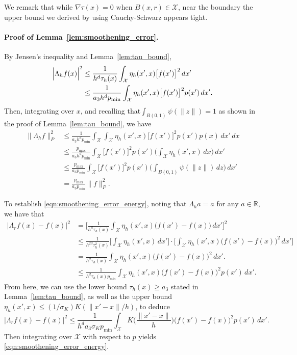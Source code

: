 \documentclass[twoside]{article}
\newcommand{\Reals}{\mathbb{R}}
\newcommand{\1}{\mathbf{1}}
\newcommand{\Xset}{\mathcal{X}}
\theoremstyle{definition}
\theoremstyle{remark}
\begin{document}
We remark that while $\nabla\tau(x) = 0$ when $B(x,r) \in \Xset$, near the boundary the upper bound we derived by using Cauchy-Schwarz appears tight. 

\paragraph{Proof of Lemma~\ref{lem:smoothening_error}.}
By Jensen's inequality and Lemma~\ref{lem:tau_bound},
\begin{align*}
\Bigl|\Lambda_hf(x)\Bigr|^2 & \leq \frac{1}{h^d\tau_h(x)}\int_{\Xset} \eta_h(x',x) \bigl[f(x')\bigr]^2 \,dx' \\
& \leq \frac{1}{a_3 h^dp_{\min}}\int_{\Xset} \eta_h(x',x) \bigl[f(x')\bigr]^2 p(x') \,dx'.
\end{align*}
Then, integrating over $x$, and recalling that$\int_{B(0,1)} \psi(\|z\|) = 1$ as shown in the proof of Lemma~\ref{lem:tau_bound}, we have
\begin{align*}
\bigl\|\Lambda_hf\bigr\|_{P}^2 & \leq \frac{1}{a_3h^d p_{\min}} \int_{\Xset} \int_{\Xset} \eta_h(x',x) \bigl[f(x')\bigr]^2 p(x') p(x) \,dx' \,dx \\ 
& \leq \frac{p_{\max}}{a_3h^dp_{\min}} \int_{\Xset} \bigl[f(x')\bigr]^2 p(x') \biggl(\int_{\Xset} \eta_h(x',x) \,dx\biggr) \,dx' \\
& \leq \frac{p_{\max}}{a_3p_{\min}} \int_{\Xset} \bigl[f(x')\bigr]^2 p(x') \biggl(\int_{B(0,1)} \psi(\|z\|) \,dz\biggr) \,dx' \\
& = \frac{p_{\max}}{a_3p_{\min}} \|f\|_{P}^2.
\end{align*}

To establish \eqref{eqn:smoothening_error_energy}, noting that $\Lambda_ha = a$ for any $a \in \Reals$, we have that
\begin{align*}
\bigl|\Lambda_rf(x) - f(x)\bigr|^2 & = \biggl[\frac{1}{h^d\tau_h(x)} \int_{\Xset} \eta_h(x',x) \bigl(f(x') - f(x)\bigr) \,dx'\biggr]^2 \\
& \leq \frac{1}{h^{2d} \tau_h^2(x)} \biggl[\int_{\Xset} \eta_h(x',x) \,dx'\biggr] \cdot \biggl[\int_{\Xset} \eta_h(x',x) \bigl(f(x') - f(x)\bigr)^2 \,dx'\biggr] \\
& = \frac{1}{h^d \tau_h(x)} \int_{\Xset} \eta_h(x',x) \bigl(f(x') - f(x)\bigr)^2 \,dx'. \\
& \leq \frac{1}{h^d \tau_h(x) p_{\min}} \int_{\Xset} \eta_h(x',x) \bigl(f(x') - f(x)\bigr)^2 p(x') \,dx'.
\end{align*}
From here, we can use the lower bound $\tau_h(x) \geq a_3$ stated in Lemma~\ref{lem:tau_bound}, as well as the upper bound $\eta_h(x',x) \leq (1/\sigma_K) K(\|x' - x\|/h)$, to deduce
\begin{equation*}
\bigl|\Lambda_rf(x) - f(x)\bigr|^2 \leq \frac{1}{h^{d} a_3 \sigma_K p_{\min}} \int_{\Xset} K\biggl(\frac{\|x' - x\|}{h}\biggr) \bigl(f(x') - f(x)\bigr)^2 p(x') \,dx'.
\end{equation*}
Then integrating over $\Xset$ with respect to $p$ yields \eqref{eqn:smoothening_error_energy}.
\end{document}
